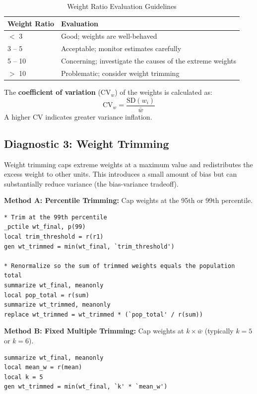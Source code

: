 \documentclass[11pt,a4paper]{article}
\begin{document}
\begin{table}[htbp]
  \centering
  \caption{Weight Ratio Evaluation Guidelines}
  \label{tab:weight_ratio_guidelines}
  \begin{tabular}{ll}
    \toprule
    \textbf{Weight Ratio} & \textbf{Evaluation} \\
    \midrule
    $<$ 3 & Good; weights are well-behaved \\
    3 -- 5 & Acceptable; monitor estimates carefully \\
    5 -- 10 & Concerning; investigate the causes of the extreme weights \\
    $>$ 10 & Problematic; consider weight trimming \\
    \bottomrule
  \end{tabular}
\end{table}

The \textbf{coefficient of variation} ($\text{CV}_w$) of the weights is calculated as:
\begin{equation}
  \text{CV}_w = \frac{\text{SD}(w_i)}{\bar{w}}
\end{equation}
A higher CV indicates greater variance inflation.

\newpage

\subsection{Diagnostic 3: Weight Trimming}
Weight trimming caps extreme weights at a maximum value and redistributes the excess weight to other units. This introduces a small amount of bias but can substantially reduce variance (the bias-variance tradeoff).

\textbf{Method A: Percentile Trimming:} Cap weights at the 95th or 99th percentile.
\begin{lstlisting}[style=stata, caption={Percentile Trimming in Stata}]
* Trim at the 99th percentile
_pctile wt_final, p(99)
local trim_threshold = r(r1)
gen wt_trimmed = min(wt_final, `trim_threshold')

* Renormalize so the sum of trimmed weights equals the population total
summarize wt_final, meanonly
local pop_total = r(sum)
summarize wt_trimmed, meanonly
replace wt_trimmed = wt_trimmed * (`pop_total' / r(sum))
\end{lstlisting}

\textbf{Method B: Fixed Multiple Trimming:} Cap weights at $k \times \bar{w}$ (typically $k = 5$ or $k = 6$).
\begin{lstlisting}[style=stata, caption={Fixed Multiple Trimming in Stata}]
summarize wt_final, meanonly
local mean_w = r(mean)
local k = 5
gen wt_trimmed = min(wt_final, `k' * `mean_w')
\end{lstlisting}
\end{document}
